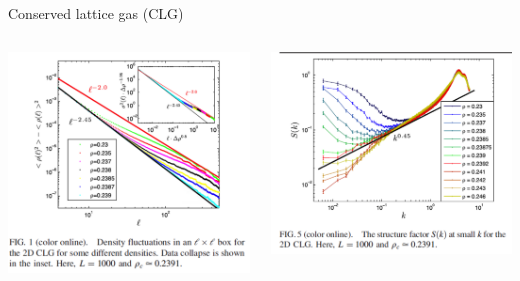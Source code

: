 \documentclass{bredelebeamer}
\begin{document}
\begin{frame}{Conserved lattice gas (CLG)}
\begin{columns}
\begin{column}{0.5\textwidth}
\includegraphics[scale=0.2]{images/1.jpg}
\end{column}

\begin{column}{0.5\textwidth}
\includegraphics[scale=0.2]{images/5.jpg}
\end{column}
\end{columns}
\end{frame}
\end{document}
